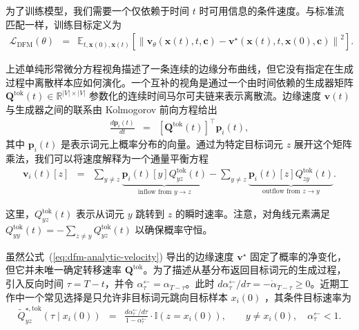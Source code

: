 \documentclass[UTF8,a4paper,zihao=-4,oneside,openany]{ctexbook}
\begin{document}
为了训练模型，我们需要一个仅依赖于时间 $t$ 时可用信息的条件速度。与标准流匹配一样，训练目标定义为
\begin{eqnarray}
\mathcal{L}_{\text{DFM}}(\theta)
& = &
\mathbb{E}_{t, \mathbf{x}(0), \mathbf{x}(t)} \left[ \left\| \mathbf{v}_\theta(\mathbf{x}(t), t, \mathbf{c}) - \mathbf{v}^\star(\mathbf{x}(t), t, \mathbf{x}(0), \mathbf{c}) \right\|^2 \right].
\label{eq:dfm-objective}
\end{eqnarray}

上述单纯形常微分方程视角描述了一条连续的边缘分布曲线，但它没有指定在生成过程中离散样本应如何演化。一个互补的视角是通过一个由时间依赖的生成器矩阵 $\mathbf{Q}^{\mathrm{tok}}(t) \in \mathbb{R}^{|V| \times |V|}$ 参数化的连续时间马尔可夫链来表示离散流。边缘速度 $\mathbf{v}(t)$ 与生成器之间的联系由 Kolmogorov 前向方程给出
\begin{eqnarray}
\frac{d\mathbf{p}_i(t)}{dt} & = & \left[ \mathbf{Q}^{\mathrm{tok}}(t) \right]^\top \mathbf{p}_i(t),
\label{eq:kolmogorov-forward}
\end{eqnarray}
其中 $\mathbf{p}_i(t)$ 是表示词元上概率分布的向量。通过为特定目标词元 $z$ 展开这个矩阵乘法，我们可以将速度解释为一个通量平衡方程
\begin{eqnarray}
\mathbf{v}_i(t)[z]
& = &
\sum_{y \neq z} \underbrace{\mathbf{p}_i(t)[y] Q^{\mathrm{tok}}_{yz}(t)}_{\text{inflow from } y \to z}
-
\sum_{y \neq z} \underbrace{\mathbf{p}_i(t)[z] Q^{\mathrm{tok}}_{zy}(t)}_{\text{outflow from } z \to y}.
\label{eq:master-equation-Q}
\end{eqnarray}

\noindent 这里，$Q^{\mathrm{tok}}_{yz}(t)$ 表示从词元 $y$ 跳转到 $z$ 的瞬时速率。注意，对角线元素满足 $Q^{\mathrm{tok}}_{yy}(t) = - \sum_{z \neq y} Q^{\mathrm{tok}}_{yz}(t)$ 以确保概率守恒。

虽然公式~(\ref{eq:dfm-analytic-velocity}) 导出的边缘速度 $\mathbf{v}^\star$ 固定了概率的净变化，但它并未唯一确定转移速率 $\mathbf{Q}^{\mathrm{tok}}$。为了描述从基分布返回目标词元的生成过程，引入反向时间 $\tau=T-t$，并令 $\alpha^\leftarrow_\tau=\alpha_{T-\tau}$。此时 $d\alpha^\leftarrow_\tau/d\tau=-\dot{\alpha}_{T-\tau}\geq0$。近期工作中一个常见选择是只允许非目标词元跳向目标样本 $x_i(0)$ \citep{campbell-etal:2024generative}，其条件目标速率为
\begin{eqnarray}
\widetilde Q^{\star,\mathrm{tok}}_{yz}(\tau\mid x_i(0))
&=&
\frac{d\alpha^\leftarrow_\tau/d\tau}{1-\alpha^\leftarrow_\tau}
\cdot\mathbb{I}(z=x_i(0)),
\qquad y\ne x_i(0),\quad \alpha^\leftarrow_\tau<1.
\label{eq:target-Q}
\end{eqnarray}
\end{document}
